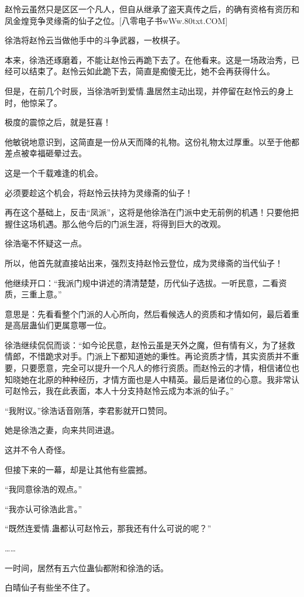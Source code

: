 \begin{this_body}
赵怜云虽然只是区区一个凡人，但自从继承了盗天真传之后，的确有资格有资历和凤金煌竞争灵缘斋的仙子之位。[八零电子书wWw.80txt.COM]

徐浩将赵怜云当做他手中的斗争武器，一枚棋子。

本来，徐浩还琢磨着，不能让赵怜云再跪下去了。在他看来。这是一场政治秀，已经可以结束了。赵怜云如此跪下去，简直是痴傻无比，她不会再获得什么。

但是，在前几个时辰，当徐浩听到爱情.蛊居然主动出现，并停留在赵怜云的身上时，他惊呆了。

极度的震惊之后，就是狂喜！

他敏锐地意识到，这简直是一份从天而降的礼物。这份礼物太过厚重。以至于他都差点被幸福砸晕过去。

这是一个千载难逢的机会。

必须要趁这个机会，将赵怜云扶持为灵缘斋的仙子！

再在这个基础上，反击“凤派”，这将是他徐浩在门派中史无前例的机遇！只要他把握住这场机遇。那么他今后的门派生涯，将得到巨大的改观。

徐浩毫不怀疑这一点。

所以，他首先就直接站出来，强烈支持赵怜云登位，成为灵缘斋的当代仙子！

他继续开口：“我派门规中讲述的清清楚楚，历代仙子选拔。一听民意，二看资质，三重上意。”

意思是：先看看整个门派的人心所向，然后看候选人的资质和才情如何，最后着重是高层蛊仙们更属意哪一位。

徐浩继续侃侃而谈：“如今论民意，赵怜云虽是天外之魔，但有情有义，为了拯救情郎，不惜跪求对手。门派上下都知道她的秉性。再论资质才情，其实资质并不重要，只要愿意，完全可以提升一个凡人的修行资质。而赵怜云的才情，相信诸位也知晓她在北原的种种经历，才情方面也是人中精英。最后是诸位的心意。我非常认可赵怜云，我在此表面，本人十分支持赵怜云成为本派的仙子。”

“我附议。”徐浩话音刚落，李君影就开口赞同。

她是徐浩之妻，向来共同进退。

这并不令人奇怪。

但接下来的一幕，却是让其他有些震撼。

“我同意徐浩的观点。”

“我亦认可徐浩此言。”

“既然连爱情.蛊都认可赵怜云，那我还有什么可说的呢？”

……

一时间，居然有五六位蛊仙都附和徐浩的话。

白晴仙子有些坐不住了。


\end{this_body}

